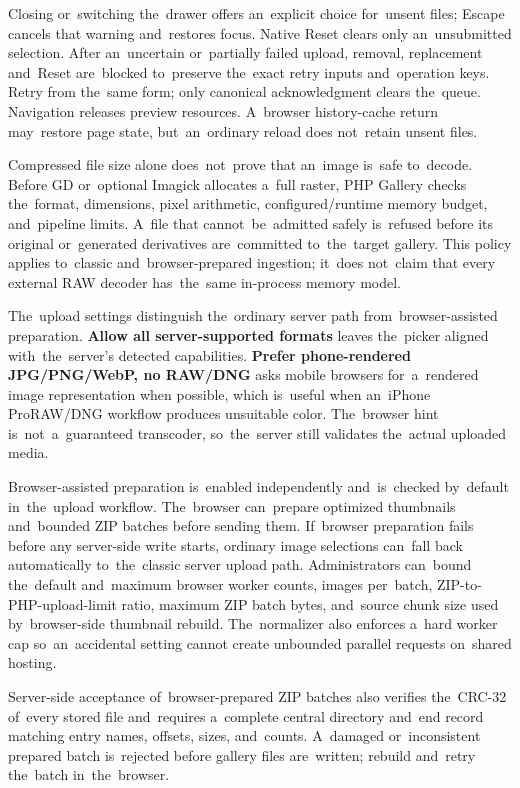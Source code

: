 \documentclass[11pt,a4paper]{article}
\newcommand{\ui}[1]{\textbf{#1}}
\begin{document}
Closing or~switching the~drawer offers an~explicit choice for~unsent files;
Escape cancels that warning and~restores focus. Native Reset clears only
an~unsubmitted selection. After an~uncertain or~partially failed upload,
removal, replacement and~Reset are~blocked to~preserve the~exact retry inputs
and~operation keys. Retry from the~same form; only canonical acknowledgment
clears the~queue. Navigation releases preview resources. A~browser history-cache
return may~restore page state, but~an~ordinary reload does not~retain unsent
files.

Compressed file size alone does~not~prove that an~image is~safe to~decode.
Before GD or~optional Imagick allocates a~full raster, PHP Gallery checks
the~format, dimensions, pixel arithmetic, configured/runtime memory budget,
and~pipeline limits. A~file that cannot~be~admitted safely is~refused before its
original or~generated derivatives are~committed to~the~target gallery. This
policy applies to~classic and~browser-prepared ingestion; it~does not~claim that
every external RAW decoder has~the~same in-process memory model.

The~upload settings distinguish the~ordinary server path from~browser-assisted
preparation. \ui{Allow all server-supported formats} leaves the~picker aligned
with~the~server's detected capabilities. \ui{Prefer phone-rendered JPG/PNG/WebP,
no RAW/DNG} asks mobile browsers for~a~rendered image representation when
possible, which is~useful when an~iPhone ProRAW/DNG workflow produces unsuitable
color. The~browser hint is~not~a~guaranteed transcoder, so~the~server still
validates the~actual uploaded media.

Browser-assisted preparation is~enabled independently and~is~checked by~default
in~the~upload workflow. The~browser can~prepare optimized thumbnails and~bounded
ZIP batches before sending them. If~browser preparation fails before any
server-side write starts, ordinary image selections can~fall back automatically
to~the~classic server upload path. Administrators can~bound the~default
and~maximum browser worker counts, images per~batch, ZIP-to-PHP-upload-limit
ratio, maximum ZIP batch bytes, and~source chunk size used by~browser-side
thumbnail rebuild. The~normalizer also enforces a~hard worker cap
so~an~accidental setting cannot create unbounded parallel requests on~shared
hosting.

Server-side acceptance of~browser-prepared ZIP batches also verifies the~CRC-32
of~every stored file and~requires a~complete central directory and~end record
matching entry names, offsets, sizes, and~counts. A~damaged or~inconsistent
prepared batch is~rejected before gallery files are~written; rebuild and~retry
the~batch in~the~browser.
\end{document}
